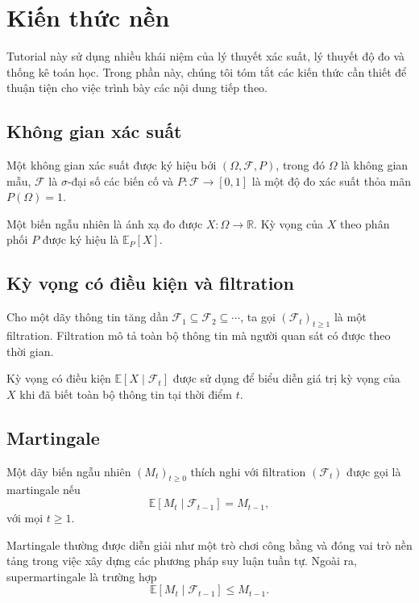 \section{Kiến thức nền}

Tutorial này sử dụng nhiều khái niệm của lý thuyết xác suất, lý thuyết
độ đo và thống kê toán học. Trong phần này, chúng tôi tóm tắt các kiến
thức cần thiết để thuận tiện cho việc trình bày các nội dung tiếp theo.

\subsection{Không gian xác suất}

Một không gian xác suất được ký hiệu bởi
$(\Omega, \mathcal{F}, P)$, trong đó $\Omega$ là không gian mẫu,
$\mathcal{F}$ là $\sigma$-đại số các biến cố và
$P : \mathcal{F} \to [0,1]$ là một độ đo xác suất thỏa mãn
$P(\Omega)=1$.

Một biến ngẫu nhiên là ánh xạ đo được
$X : \Omega \rightarrow \mathbb{R}$.
Kỳ vọng của $X$ theo phân phối $P$ được ký hiệu là
$\mathbb{E}_P[X]$.

\subsection{Kỳ vọng có điều kiện và filtration}

Cho một dãy thông tin tăng dần
$\mathcal{F}_1 \subseteq \mathcal{F}_2 \subseteq \cdots$,
ta gọi $(\mathcal{F}_t)_{t\ge1}$ là một filtration.
Filtration mô tả toàn bộ thông tin mà người quan sát có được theo thời
gian.

Kỳ vọng có điều kiện
$\mathbb{E}[X \mid \mathcal{F}_t]$
được sử dụng để biểu diễn giá trị kỳ vọng của $X$ khi đã biết toàn bộ
thông tin tại thời điểm $t$.

\subsection{Martingale}

Một dãy biến ngẫu nhiên
$(M_t)_{t\ge0}$ thích nghi với filtration
$(\mathcal{F}_t)$ được gọi là martingale nếu
\begin{equation}
\mathbb{E}[M_t \mid \mathcal{F}_{t-1}]
= M_{t-1},
\end{equation}
với mọi $t \ge 1$.

Martingale thường được diễn giải như một trò chơi công bằng và đóng vai
trò nền tảng trong việc xây dựng các phương pháp suy luận tuần tự.
Ngoài ra, supermartingale là trường hợp
\begin{equation}
\mathbb{E}[M_t \mid \mathcal{F}_{t-1}]
\le M_{t-1}.
\end{equation}

